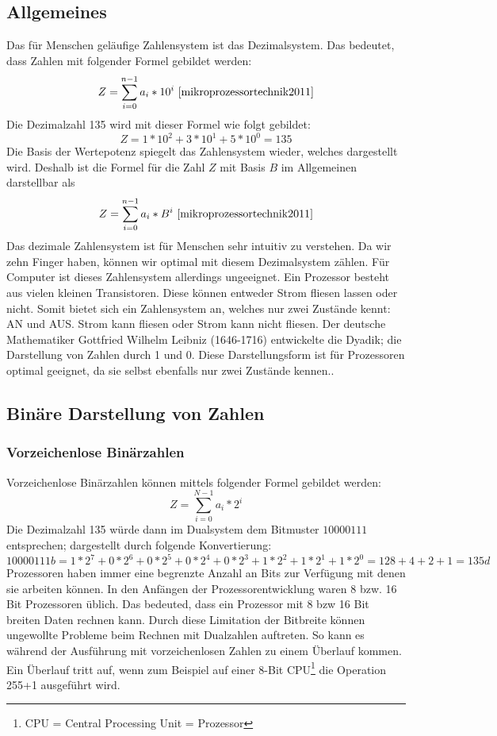 \documentclass[12pt]{article}
\begin{document}
\subsection{Allgemeines}
Das für Menschen geläufige Zahlensystem ist das Dezimalsystem. Das bedeutet, dass Zahlen mit folgender Formel gebildet werden:
$$Z=\sum\limits_{i=0}^{n-1} a_i * 10^i \ \cite{mikroprozessortechnik2011}$$
Die Dezimalzahl 135 wird mit dieser Formel wie folgt gebildet:$$Z=1*10^2+3*10^1+5*10^0 = 135$$
Die Basis der Wertepotenz spiegelt das Zahlensystem wieder, welches dargestellt wird. Deshalb ist die Formel für die Zahl $Z$ mit Basis $B$ im Allgemeinen darstellbar als
$$Z=\sum\limits_{i=0}^{n-1} a_i * B^i \ \cite{mikroprozessortechnik2011}$$ 
Das dezimale Zahlensystem ist für Menschen sehr intuitiv zu verstehen. Da wir zehn Finger haben, können wir optimal mit diesem Dezimalsystem zählen. Für Computer ist dieses Zahlensystem allerdings ungeeignet. Ein Prozessor besteht aus vielen kleinen Transistoren. Diese können entweder Strom fliesen lassen oder nicht. Somit bietet sich ein Zahlensystem an, welches nur zwei Zustände kennt: AN und AUS. Strom kann fliesen oder Strom kann nicht fliesen. Der deutsche Mathematiker Gottfried Wilhelm Leibniz (1646-1716) entwickelte die Dyadik; die Darstellung von Zahlen durch 1 und 0. Diese Darstellungsform ist für Prozessoren optimal geeignet, da sie selbst ebenfalls nur zwei Zustände kennen.\cite{mikroprozessortechnik2011}.

\subsection{Binäre Darstellung von Zahlen}

\subsubsection{Vorzeichenlose Binärzahlen}
Vorzeichenlose Binärzahlen können mittels folgender Formel gebildet werden: $$Z=\sum\limits_{i=0}^{N-1} a_i * 2^i$$ 
Die Dezimalzahl 135 würde dann im Dualsystem dem Bitmuster $10000111$ entsprechen; dargestellt durch folgende Konvertierung:
$$10000111b = 1*2^7+0*2^6+0*2^5+0*2^4+0*2^3+1*2^2+1*2^1+1*2^0 = 128 +4+2+1 = 135d$$
Prozessoren haben immer eine begrenzte Anzahl an Bits zur Verfügung mit denen sie arbeiten können. In den Anfängen der Prozessorentwicklung waren 8 bzw. 16 Bit Prozessoren üblich. Das bedeuted, dass ein Prozessor mit 8 bzw 16 Bit breiten Daten rechnen kann. Durch diese Limitation der Bitbreite können ungewollte Probleme beim Rechnen mit Dualzahlen auftreten. So kann es während der Ausführung mit vorzeichenlosen Zahlen zu einem Überlauf kommen. Ein Überlauf tritt auf, wenn zum Beispiel auf einer 8-Bit CPU\footnote{CPU =  Central Processing Unit = Prozessor} die Operation 255+1 ausgeführt wird.
\end{document}
